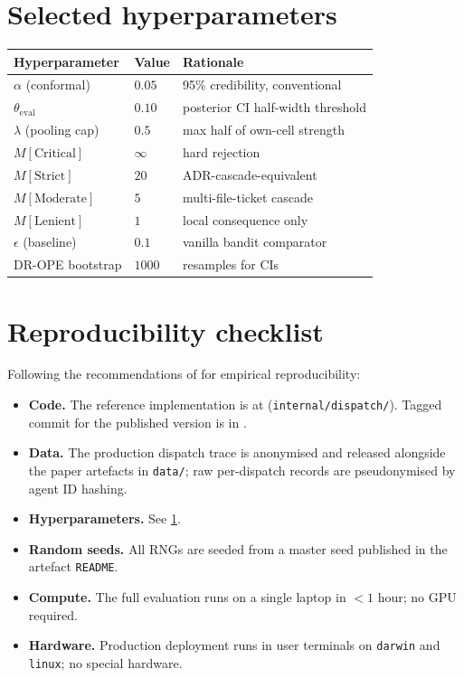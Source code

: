 \section{Selected hyperparameters}
\label{app:hyperparams}

\begin{center}
\begin{tabular}{lll}
\toprule
Hyperparameter & Value & Rationale \\
\midrule
$\alpha$ (conformal)        & $0.05$  & 95\% credibility, conventional \\
$\theta_{\mathrm{eval}}$    & $0.10$  & posterior CI half-width threshold \\
$\lambda$ (pooling cap)     & $0.5$   & max half of own-cell strength \\
$M[\text{Critical}]$        & $\infty$ & hard rejection \\
$M[\text{Strict}]$          & $20$    & ADR-cascade-equivalent \\
$M[\text{Moderate}]$        & $5$     & multi-file-ticket cascade \\
$M[\text{Lenient}]$         & $1$     & local consequence only \\
$\epsilon$ (baseline)       & $0.1$   & vanilla bandit comparator \\
DR-OPE bootstrap            & $1000$  & resamples for CIs \\
\bottomrule
\end{tabular}
\end{center}

\section{Reproducibility checklist}
\label{app:repro}

Following the recommendations of \cite{pineau2021improving} for empirical
reproducibility:

\begin{itemize}[leftmargin=*]
  \item \textbf{Code.} The reference implementation is at
        \cite{german2026blackrim} (\texttt{internal/dispatch/}). Tagged
        commit for the published version is in \cite{blackrim_paper_repo}.
  \item \textbf{Data.} The production dispatch trace is anonymised and
        released alongside the paper artefacts in \texttt{data/}; raw
        per-dispatch records are pseudonymised by agent ID hashing.
  \item \textbf{Hyperparameters.} See \cref{app:hyperparams}.
  \item \textbf{Random seeds.} All RNGs are seeded from a master seed
        published in the artefact \texttt{README}.
  \item \textbf{Compute.} The full evaluation runs on a single laptop
        in $< 1$ hour; no GPU required.
  \item \textbf{Hardware.} Production deployment runs in user terminals
        on \texttt{darwin} and \texttt{linux}; no special hardware.
\end{itemize}

